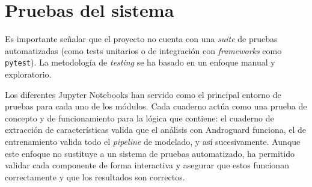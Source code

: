 \section{Pruebas del sistema}
Es importante señalar que el proyecto no cuenta con una \textit{suite} de pruebas automatizadas (como tests unitarios o de integración con \textit{frameworks} como \texttt{pytest}). La metodología de \textit{testing} se ha basado en un enfoque manual y exploratorio.

Los diferentes Jupyter Notebooks han servido como el principal entorno de pruebas para cada uno de los módulos. Cada cuaderno actúa como una prueba de concepto y de funcionamiento para la lógica que contiene: el cuaderno de extracción de características valida que el análisis con Androguard funciona, el de entrenamiento valida todo el \textit{pipeline} de modelado, y así sucesivamente. Aunque este enfoque no sustituye a un sistema de pruebas automatizado, ha permitido validar cada componente de forma interactiva y asegurar que estos funcionan correctamente y que los resultados son correctos.
